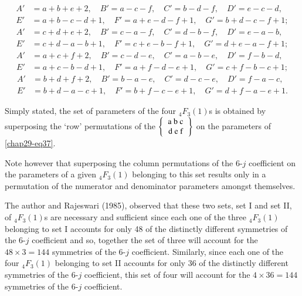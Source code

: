 {\fontsize{9.4pt}{11pt}\selectfont
\begin{equation}
\begin{split}
A' & = a+b+e+2, \quad B'=a-c-f, \quad C'=b-d-f, \quad D'=e-c-d,\\
E' & = a+b-c-d+1, \quad F'=a+e-d-f+1, \quad G'=b+d-c-f+1;\label{chap29-eq38}
\end{split}
\end{equation}
\begin{equation}
\begin{split}
A' & = c+d+e+2, \quad B'=c-a-f, \quad C'=d-b-f, \quad D'=e-a-b,\\
E' & = c+d-a-b+1, \quad F'=c+e-b-f+1, \quad G'=d+e-a-f+1;\label{chap29-eq39}
\end{split}
\end{equation}
\begin{equation}
\begin{split}
A' & = a+c+f+2, \quad B'=c-d-e, \quad C'=a-b-e, \quad D'=f-b-d,\\
E' & = a+c-b-d+1, \quad F'=a+f-d-e+1, \quad G'=c+f-b-c+1; \label{chap29-eq40}
\end{split}
\end{equation}
\begin{equation}
\begin{split}
A' & = b+d+f+2, \quad B'=b-a-e, \quad C'=d-c-e, \quad D'=f-a-c,\\
E' & = b+d-a-c+1, \quad F'=b+f-c-e+1, \quad G'=d+f-a-e+1. \label{chap29-eq41}
\end{split}
\end{equation}}\relax

Simply stated, the set of parameters of the four $_4F_3(1)$s is obtained by superposing the `row' permutations of the $\left\{ \begin{tabular} {c} a\ b\ c\\ d\ e\ f \\ \end{tabular} \right\}$ on the parameters of \eqref{chap29-eq37}.

Note however that superposing the column permutations of the 6-$j$ coefficient on the parameters of a given $_4F_3(1)$ belonging to this set results only in a permutation of the numerator and denominator parameters amongst themselves.

The author and Rajeswari (1985), observed that these two sets, set I and set II, of $_4F_3(1)$s are necessary and sufficient since each one of the three $_4F_3(1)$ belonging to set I accounts for only 48 of the distinctly different symmetries of the 6-$j$ coefficient and so, together the set of three will account for the $48\times 3 = 144$ symmetries of the 6-$j$ coefficient. Similarly, since each one of the four $_4F_3(1)$ belonging to set II accounts for only 36 of the distinctly different symmetries of the 6-$j$ coefficient, this set of four will account for the $4\times 36 = 144$ symmetries of the 6-$j$ coefficient.

